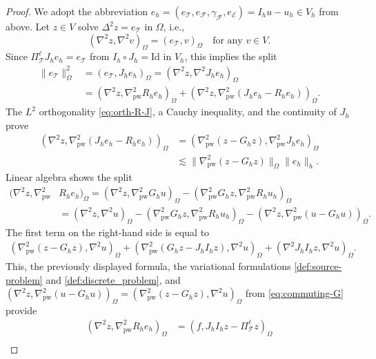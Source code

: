 \documentclass[10pt,a4paper]{amsart}
\def\E{\mathcal{E}}
\def\F{\mathcal{F}}
\def\T{\mathcal{T}}
\def\pw{\mathrm{pw}}
\begin{document}
\begin{proof}
    We adopt the abbreviation $e_h = (e_\T, e_\F, \gamma_\F, e_\E) = I_h u - u_h \in V_h$ from above. Let $z\in V$ solve $\Delta^2 z = e_{\mathcal{T}}$ in $\Omega$, i.e.,
    \begin{equation*}
    	(\nabla^2 z,\nabla^2v)_{\Omega} = (e_\T, v)_{\Omega} \quad \text{for any } v \in V.
    \end{equation*}
    Since $\Pi_\T^\ell J_h e_h = e_\T$ from $I_h \circ J_h = \mathrm{Id}$ in $V_h$, this implies the split
    \begin{align}\label{eq:proof-L2-split}
    	\|e_\T\|_\Omega^2 &= (e_\T, J_h e_h)_{\Omega} = (\nabla^2 z,\nabla^2 J_h e_h)_{\Omega}\nonumber\\
    	& = (\nabla^2 z,\nabla^2_\pw R_h e_h)_{\Omega} + (\nabla^2 z, \nabla^2_\pw (J_h e_h - R_h e_h))_{\Omega}.
    \end{align}
    The $L^2$ orthogonality \eqref{eq:orth-R-J}, a Cauchy inequality, and the continuity of $J_h$ prove
    \begin{align}\label{ineq:proof-L2-1}
    	(\nabla^2 z, \nabla^2_\pw (J_h e_h - R_h e_h))_{\Omega} & = (\nabla^2_\pw (z- G_h z),\nabla^2_\pw J_h e_h)_{\Omega}\nonumber\\
    	&\lesssim \|\nabla^2_\pw (z - G_h z)\|_\Omega \|e_h\|_h.
    \end{align}
    Linear algebra shows the split
    \begin{align*}
    	(\nabla^2 z,\nabla^2_\pw &R_h e_h)_{\Omega} = (\nabla^2 z, \nabla^2_\pw G_h u)_\Omega - (\nabla^2_\pw G_h z, \nabla^2_\pw R_h u_h)_\Omega\\
    	&= (\nabla^2 z, \nabla^2 u)_\Omega - (\nabla^2_\pw G_h z, \nabla^2_\pw R_h u_h)_\Omega - (\nabla^2 z, \nabla^2_\pw(u - G_h u))_\Omega.
    \end{align*}
    The first term on the right-hand side is equal to
    \begin{align*}
    	 (\nabla^2_\pw(z - G_h z), \nabla^2 u)_\Omega + (\nabla_\pw^2(G_h z - J_h I_h z), \nabla^2 u)_\Omega + (\nabla^2 J_h I_h z, \nabla^2 u)_\Omega.
    \end{align*}
    This, the previously displayed formula, the variational formulations \eqref{def:source-problem} and \eqref{def:discrete_problem}, and $(\nabla^2 z, \nabla^2_\pw(u - G_h u))_\Omega = (\nabla^2_\pw(z - G_h z), \nabla^2 u)_\Omega$ from \eqref{eq:commuting-G} provide
    \begin{align}\label{eq:proof-L2-identity}
    	(\nabla^2 z,\nabla^2_\pw R_h e_h)_{\Omega} &= (f, J_h I_h z - \Pi_\T^\ell z)_\Omega\nonumber\\

\end{align}
\end{proof}
\end{document}
